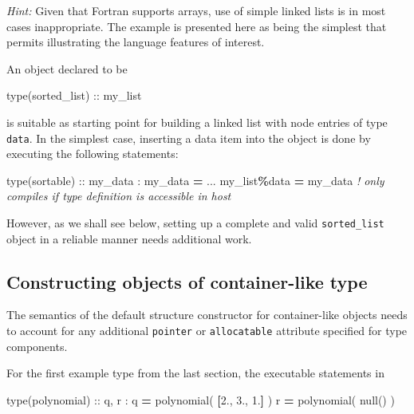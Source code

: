 \documentclass[
  paper=a4,
  ,captions=tableheading
]{scrartcl}
\newenvironment{Shaded}{\begin{snugshade}}{\end{snugshade}}
\newcommand{\CommentTok}[1]{\textcolor[rgb]{0.56,0.35,0.01}{\textit{#1}}}
\newcommand{\DataTypeTok}[1]{\textcolor[rgb]{0.13,0.29,0.53}{#1}}
\newcommand{\FloatTok}[1]{\textcolor[rgb]{0.00,0.00,0.81}{#1}}
\newcommand{\KeywordTok}[1]{\textcolor[rgb]{0.13,0.29,0.53}{\textbf{#1}}}
\newcommand{\NormalTok}[1]{#1}
\newcommand{\OperatorTok}[1]{\textcolor[rgb]{0.81,0.36,0.00}{\textbf{#1}}}
\begin{document}
\emph{Hint:} Given that Fortran supports arrays, use of simple linked
lists is in most cases inappropriate. The example is presented here as
being the simplest that permits illustrating the language features of
interest.

An object declared to be

\begin{Shaded}
\begin{Highlighting}[]
\DataTypeTok{type(sorted\_list)} \DataTypeTok{::}\NormalTok{ my\_list}
\end{Highlighting}
\end{Shaded}

is suitable as starting point for building a linked list with node
entries of type \texttt{data}. In the simplest case, inserting a data
item into the object is done by executing the following statements:

\begin{Shaded}
\begin{Highlighting}[]
\DataTypeTok{type(sortable)} \DataTypeTok{::}\NormalTok{ my\_data}
\NormalTok{:}
\NormalTok{my\_data }\KeywordTok{=}\NormalTok{ ...}
\NormalTok{my\_list}\OperatorTok{\%}\NormalTok{data }\KeywordTok{=}\NormalTok{ my\_data  }\CommentTok{! only compiles if type definition is accessible in host}
\end{Highlighting}
\end{Shaded}

However, as we shall see below, setting up a complete and valid
\texttt{sorted\_list} object in a reliable manner needs additional work.

\subsection{Constructing objects of container-like
type}\label{constructing-objects-of-container-like-type}

The semantics of the default structure constructor for container-like
objects needs to account for any additional \texttt{pointer} or
\texttt{allocatable} attribute specified for type components.

For the first example type from the last section, the executable
statements in

\begin{Shaded}
\begin{Highlighting}[]
\DataTypeTok{type(polynomial)} \DataTypeTok{::}\NormalTok{ q, r}
\NormalTok{:}
\NormalTok{q }\KeywordTok{=}\NormalTok{ polynomial( }\KeywordTok{[}\FloatTok{2.}\NormalTok{, }\FloatTok{3.}\NormalTok{, }\FloatTok{1.}\KeywordTok{]}\NormalTok{ )}
\NormalTok{r }\KeywordTok{=}\NormalTok{ polynomial( null() )}
\end{Highlighting}
\end{Shaded}
\end{document}
